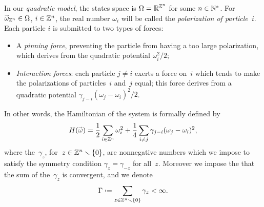 \begin{Def}
In our \emph{quadratic model}, the states space is $\Omega = \mathbb{R}^{\mathbb{Z}^n}$
for some $n\in\mathbb{N}^*$. For~$\vec\omega_{\ZZ^n} \in \Omega$, $i\in\mathbb{Z}^n$,
the real number $\omega_i$ will be called the \emph{polarization of particle~$i$}.
Each particle $i$ is submitted to two types of forces:
%
\begin{itemize}
\item A \emph{pinning force}, preventing the particle from having a too large polarization,
which derives from the quadratic potential $\omega_i^2/2$;
\item \emph{Interaction forces}: each particle $j\neq i$ exerts a force on~$i$
which tends to make the polarizations of particles~$i$ and~$j$ equal;
this force derives from a quadratic potential $\gamma_{j-i} (\omega_j-\omega_i)^2/2$.
\end{itemize}
%
In other words, the Hamiltonian of the system is formally defined by
\[ H(\vec\omega) = \frac{1}{2}\sum_{i\in\ZZ^n} \omega_i^2
+ \frac{1}{4}\sum_{i\neq j} \gamma_{j-i} (\omega_j-\omega_i)^2 ,\]
where the~$\gamma_z$, for~$z\in\mathbb{Z}^n\smallsetminus\{0\}$,
are nonnegative numbers which we impose to satisfy the symmetry condition
$\gamma_z = \gamma_{-z}$ for all~$z$.
%
Moreover we impose the that the sum of the~$\gamma_z$ is convergent, and we denote
\[\label{f2380} \Gamma \coloneqq \sum_{z\in\ZZ^n\setminus\{0\}} \gamma_z < \infty .\]
\end{Def}

